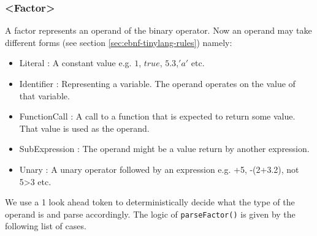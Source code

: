 \subsubsection{<Factor>}
\label{sec:parse factor expression}
A factor represents an operand of the binary operator. Now an operand may take different forms (see section \ref{sec:ebnf-tinylang-rules}) namely:
\begin{itemize}
    \item Literal : A constant value e.g. $1$, $true$, $5.3$,$'a'$ etc.
    \item Identifier : Representing a variable. The operand operates on the value of that variable.
    \item FunctionCall : A call to a function that is expected to return some value. That value is used as the operand.
    \item SubExpression : The operand might be a value return by another expression.
    \item Unary  : A unary operator followed by an expression e.g. +5,  -(2+3.2), not 5>3 etc.
\end{itemize}
We use a 1 look ahead token to deterministically decide what the type of the operand is and parse accordingly.
\vskip 0.1in
The logic of \verb!parseFactor()! is given by the following list of cases.

